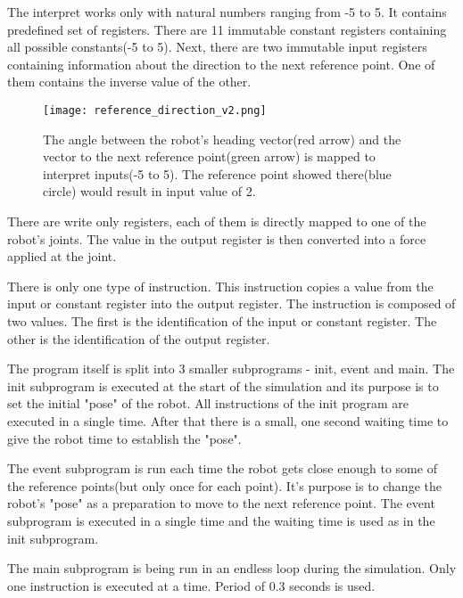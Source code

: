 \documentclass{ExcelAtFIT}
\begin{document}
The interpret works only with natural numbers ranging from -5 to 5.
It contains predefined set of registers.
There are 11 immutable constant registers containing all possible constants(-5 to 5).
Next, there are two immutable input registers containing information about the direction to the next reference point.
One of them contains the inverse value of the other.
\begin{figure}[t]
	\centering
	{\texttt{[image: reference\_direction\_v2.png]}}
	\caption{
		The angle between the robot's heading vector(red arrow) and the vector to the next reference point(green arrow) is mapped to interpret inputs(-5 to 5).
		The reference point showed there(blue circle) would result in input value of 2.
	}
	\label{fig:ReferenceDirection}
\end{figure}

There are write only registers, each of them is directly mapped to one of the robot's joints.
The value in the output register is then converted into a force applied at the joint.

There is only one type of instruction.
This instruction copies a value from the input or constant register into the output register.
The instruction is composed of two values.
The first is the identification of the input or constant register.
The other is the identification of the output register.

The program itself is split into 3 smaller subprograms - init, event and main.
The init subprogram is executed at the start of the simulation and its purpose is to set the initial "pose" of the robot.
All instructions of the init program are executed in a single time.
After that there is a small, one second waiting time to give the robot time to establish the "pose".

The event subprogram is run each time the robot gets close enough to some of the reference points(but only once for each point).
It's purpose is to change the robot's "pose" as a preparation to move to the next reference point.
The event subprogram is executed in a single time and the waiting time is used as in the init subprogram.

The main subprogram is being run in an endless loop during the simulation.
Only one instruction is executed at a time.
Period of 0.3 seconds is used.


\end{document}
